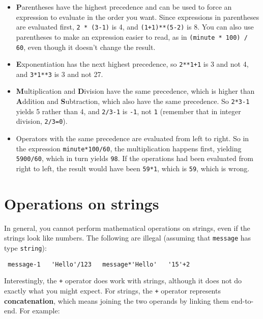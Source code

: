 \begin{itemize}

\item {\bf P}arentheses have the highest precedence and can be used 
to force an expression to evaluate in the order you want. Since
expressions in parentheses are evaluated first, {\tt 2 * (3-1)} is 4,
and {\tt (1+1)**(5-2)} is 8. You can also use parentheses to make an
expression easier to read, as in {\tt (minute * 100) / 60}, even
though it doesn't change the result.

\item {\bf E}xponentiation has the next highest precedence, so
{\tt 2**1+1} is 3 and not 4, and {\tt 3*1**3} is 3 and not 27.

\item {\bf M}ultiplication and {\bf D}ivision have the same precedence,
which is higher than {\bf A}ddition and {\bf S}ubtraction, which also
have the same precedence.  So {\tt 2*3-1} yields 5 rather than 4, and
{\tt 2/3-1} is {\tt -1}, not {\tt 1} (remember that in integer
division, {\tt 2/3=0}).

\item Operators with the same precedence are evaluated from left to 
right.  So in the expression {\tt minute*100/60}, the multiplication
happens first, yielding {\tt 5900/60}, which in turn yields {\tt 98}.
If the operations had been evaluated from right to left, the result
would have been {\tt 59*1}, which is {\tt 59}, which is wrong.

\end{itemize}


\section{Operations on strings}

In general, you cannot perform mathematical operations on strings, even
if the strings look like numbers.  The following are illegal (assuming
that {\tt message} has type {\tt string}):

\beforeverb
\begin{verbatim}
 message-1   'Hello'/123   message*'Hello'   '15'+2
\end{verbatim}
\afterverb
%
Interestingly, the {\tt +} operator does work with strings, although it
does not do exactly what you might expect.  For strings, the {\tt +} operator
represents {\bf concatenation}, which means joining the two operands by
linking them end-to-end.  For example:

